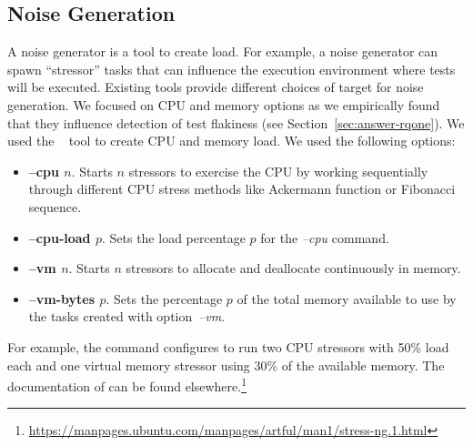 \documentclass[conference]{IEEEtran}
\begin{document}


\subsection{Noise Generation}
\label{sec:noise-generation}

A noise generator is a tool to create load. For example, a noise generator can spawn ``stressor'' tasks that can influence the execution environment where tests will be executed. Existing tools provide different choices of target for noise generation. We focused on CPU and memory options as we empirically found that they influence detection of test flakiness (see Section~\ref{sec:answer-rqone}). We used the \sng{}~\cite{stress-ng} tool to create CPU and memory load. 
We used the following options:

\begin{itemize}[topsep=.2ex,itemsep=.2ex,leftmargin=0.8em]
    \item \textbf{--cpu $n$}. Starts $n$ stressors to exercise the CPU by working sequentially through different CPU stress methods like Ackermann function or Fibonacci sequence.
    \item \textbf{--cpu-load $p$}. Sets the load percentage $p$ for the \textit{--cpu} command.
    \item \textbf{--vm $n$}. Starts $n$ stressors to allocate and deallocate continuously in memory.
    \item \textbf{--vm-bytes $p$}. Sets the percentage $p$ of the total memory available to use by the tasks created with option~\textit{--vm}.
\end{itemize}

For example, the command  configures \sng{} to run two CPU stressors with 50\% load each and one virtual memory stressor using 30\% of the available memory. The documentation of \sng{} can be found elsewhere.\footnote{\url{https://manpages.ubuntu.com/manpages/artful/man1/stress-ng.1.html}} 
\end{document}
